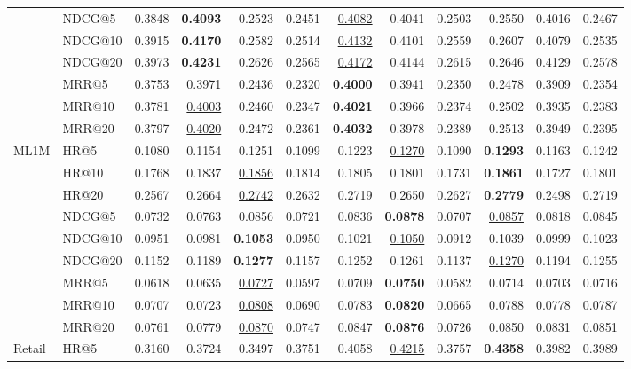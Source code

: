 \begin{tabular}{llrrrrrrrrrr}
 & NDCG@5 & 0.3848 & \textbf{0.4093} & 0.2523 & 0.2451 & \underline{0.4082} & 0.4041 & 0.2503 & 0.2550 & 0.4016 & 0.2467 \\
 & NDCG@10 & 0.3915 & \textbf{0.4170} & 0.2582 & 0.2514 & \underline{0.4132} & 0.4101 & 0.2559 & 0.2607 & 0.4079 & 0.2535 \\
 & NDCG@20 & 0.3973 & \textbf{0.4231} & 0.2626 & 0.2565 & \underline{0.4172} & 0.4144 & 0.2615 & 0.2646 & 0.4129 & 0.2578 \\
 & MRR@5 & 0.3753 & \underline{0.3971} & 0.2436 & 0.2320 & \textbf{0.4000} & 0.3941 & 0.2350 & 0.2478 & 0.3909 & 0.2354 \\
 & MRR@10 & 0.3781 & \underline{0.4003} & 0.2460 & 0.2347 & \textbf{0.4021} & 0.3966 & 0.2374 & 0.2502 & 0.3935 & 0.2383 \\
 & MRR@20 & 0.3797 & \underline{0.4020} & 0.2472 & 0.2361 & \textbf{0.4032} & 0.3978 & 0.2389 & 0.2513 & 0.3949 & 0.2395 \\
\hline
ML1M & HR@5 & 0.1080 & 0.1154 & 0.1251 & 0.1099 & 0.1223 & \underline{0.1270} & 0.1090 & \textbf{0.1293} & 0.1163 & 0.1242 \\
 & HR@10 & 0.1768 & 0.1837 & \underline{0.1856} & 0.1814 & 0.1805 & 0.1801 & 0.1731 & \textbf{0.1861} & 0.1727 & 0.1801 \\
 & HR@20 & 0.2567 & 0.2664 & \underline{0.2742} & 0.2632 & 0.2719 & 0.2650 & 0.2627 & \textbf{0.2779} & 0.2498 & 0.2719 \\
 & NDCG@5 & 0.0732 & 0.0763 & 0.0856 & 0.0721 & 0.0836 & \textbf{0.0878} & 0.0707 & \underline{0.0857} & 0.0818 & 0.0845 \\
 & NDCG@10 & 0.0951 & 0.0981 & \textbf{0.1053} & 0.0950 & 0.1021 & \underline{0.1050} & 0.0912 & 0.1039 & 0.0999 & 0.1023 \\
 & NDCG@20 & 0.1152 & 0.1189 & \textbf{0.1277} & 0.1157 & 0.1252 & 0.1261 & 0.1137 & \underline{0.1270} & 0.1194 & 0.1255 \\
 & MRR@5 & 0.0618 & 0.0635 & \underline{0.0727} & 0.0597 & 0.0709 & \textbf{0.0750} & 0.0582 & 0.0714 & 0.0703 & 0.0716 \\
 & MRR@10 & 0.0707 & 0.0723 & \underline{0.0808} & 0.0690 & 0.0783 & \textbf{0.0820} & 0.0665 & 0.0788 & 0.0778 & 0.0787 \\
 & MRR@20 & 0.0761 & 0.0779 & \underline{0.0870} & 0.0747 & 0.0847 & \textbf{0.0876} & 0.0726 & 0.0850 & 0.0831 & 0.0851 \\
\hline
Retail & HR@5 & 0.3160 & 0.3724 & 0.3497 & 0.3751 & 0.4058 & \underline{0.4215} & 0.3757 & \textbf{0.4358} & 0.3982 & 0.3989 \\

\end{tabular}
